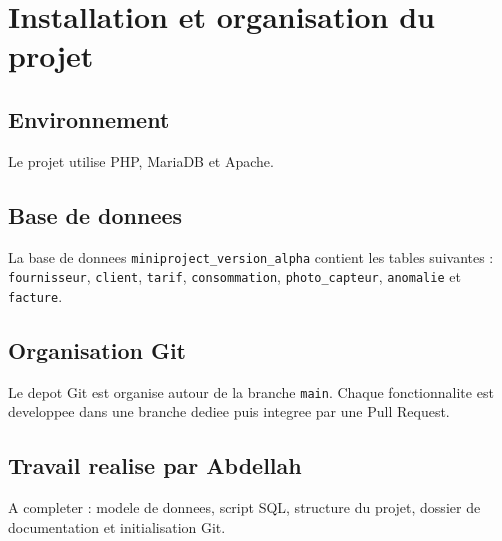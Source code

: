 \section{Installation et organisation du projet}

\subsection{Environnement}

Le projet utilise PHP, MariaDB et Apache.

\subsection{Base de donnees}

La base de donnees \texttt{miniproject\_version\_alpha} contient les tables suivantes : \texttt{fournisseur}, \texttt{client}, \texttt{tarif}, \texttt{consommation}, \texttt{photo\_capteur}, \texttt{anomalie} et \texttt{facture}.

\subsection{Organisation Git}

Le depot Git est organise autour de la branche \texttt{main}. Chaque fonctionnalite est developpee dans une branche dediee puis integree par une Pull Request.

\subsection{Travail realise par Abdellah}

A completer : modele de donnees, script SQL, structure du projet, dossier de documentation et initialisation Git.
